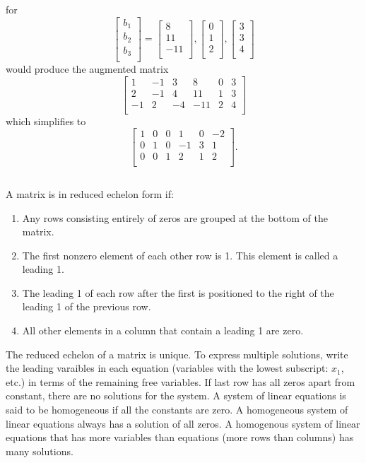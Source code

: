 \documentclass{article}
\begin{document}
for 
\[
\begin{bmatrix}
    b_1 \\
    b_2 \\
    b_3 \\
\end{bmatrix}
=
\begin{bmatrix}
    8 \\
    11 \\
    -11 \\
\end{bmatrix},
\begin{bmatrix}
    0 \\
    1 \\
    2 \\
\end{bmatrix},
\begin{bmatrix}
    3 \\
    3 \\
    4 \\
\end{bmatrix}
\]
would produce the augmented matrix
\[
\begin{bmatrix}
    1 & -1 & 3 & 8 & 0 & 3 \\
    2 & -1 & 4 & 11 & 1 & 3 \\
    -1 & 2 & -4 & -11 & 2 & 4 \\
\end{bmatrix}
\]
which simplifies to 
\[
\begin{bmatrix}
    1 & 0 & 0 & 1 & 0 & -2 \\
    0 & 1 & 0 & -1 & 3 & 1 \\
    0 & 0 & 1 & 2 & 1 & 2 \\
\end{bmatrix}.
\]
\subsection{}
A matrix is in reduced echelon form if:
\begin{enumerate}
    \item Any rows consisting entirely of zeros are grouped at the bottom of the matrix.
    \item The first nonzero element of each other row is 1. This element is called a leading 1. 
    \item The leading 1 of each row after the first is positioned to the right of the leading 1 of the previous row.
    \item All other elements in a column that contain a leading 1 are zero. 
\end{enumerate}
The reduced echelon of a matrix is unique. 
To express multiple solutions, write the leading varaibles in each equation 
(variables with the lowest subscript: $x_1$, etc.)  in terms of the remaining free variables.
If last row has all zeros apart from constant, there are no solutions for the system.
A system of linear equations is said to be homogeneous if all the constants are zero.  
A homogeneous system of linear equations always has a solution of all zeros. 
A homogenous system of linear equations that has more variables than equations (more rows than columns) 
has many solutions.
\subsection{}
\end{document}

